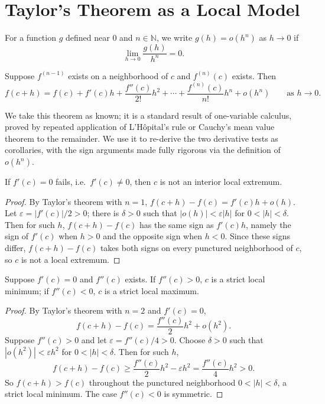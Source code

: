 \documentclass{essay}
\begin{document}
\section{Taylor's Theorem as a Local Model}

\begin{definition}[Little-\(o\)]
  For a function \(g\) defined near \(0\) and \(n\in\mathbb{N}\), we write
  \(g(h)=o(h^{n})\) as \(h\to0\) if
  \[ \lim_{h\to0}\frac{g(h)}{h^{n}}=0. \]
\end{definition}

\begin{theorem}
  Suppose \(f^{(n-1)}\) exists on a neighborhood of \(c\) and \(f^{(n)}(c)\)
  exists. Then
  \[ f(c+h)=f(c)+f'(c)h+\frac{f''(c)}{2!}h^{2}+\cdots+\frac{f^{(n)}(c)}{n!}h^{n}+o(h^{n}) \qquad\text{as } h\to0. \]
\end{theorem}

We take this theorem as known; it is a standard result of one-variable
calculus, proved by repeated application of L'H\^opital's rule or Cauchy's
mean value theorem to the remainder. We use it to re-derive the two
derivative tests as corollaries, with the sign arguments made fully
rigorous via the definition of \(o(h^{n})\).

\begin{corollary}
  If \(f'(c)=0\) fails, i.e.\ \(f'(c)\neq0\), then \(c\) is not an interior
  local extremum.
\end{corollary}

\begin{proof}
  By Taylor's theorem with \(n=1\), \(f(c+h)-f(c)=f'(c)h+o(h)\). Let
  \(\varepsilon=|f'(c)|/2>0\); there is \(\delta>0\) such that
  \(|o(h)|<\varepsilon|h|\) for \(0<|h|<\delta\). Then for such \(h\),
  \(f(c+h)-f(c)\) has the same sign as \(f'(c)h\), namely the sign of
  \(f'(c)\) when \(h>0\) and the opposite sign when \(h<0\). Since these
  signs differ, \(f(c+h)-f(c)\) takes both signs on every punctured
  neighborhood of \(c\), so \(c\) is not a local extremum.
\end{proof}

\begin{corollary}
  Suppose \(f'(c)=0\) and \(f''(c)\) exists. If \(f''(c)>0\), \(c\) is a
  strict local minimum; if \(f''(c)<0\), \(c\) is a strict local maximum.
\end{corollary}

\begin{proof}
  By Taylor's theorem with \(n=2\) and \(f'(c)=0\),
  \[ f(c+h)-f(c)=\frac{f''(c)}{2}h^{2}+o(h^{2}). \]
  Suppose \(f''(c)>0\) and let \(\varepsilon=f''(c)/4>0\). Choose \(\delta>0\)
  such that \(|o(h^{2})|<\varepsilon h^{2}\) for \(0<|h|<\delta\). Then for such
  \(h\),
  \[ f(c+h)-f(c) \geq \frac{f''(c)}{2}h^{2}-\varepsilon h^{2} = \frac{f''(c)}{4}h^{2}>0. \]
  So \(f(c+h)>f(c)\) throughout the punctured neighborhood \(0<|h|<\delta\),
  a strict local minimum. The case \(f''(c)<0\) is symmetric.
\end{proof}
\end{document}

